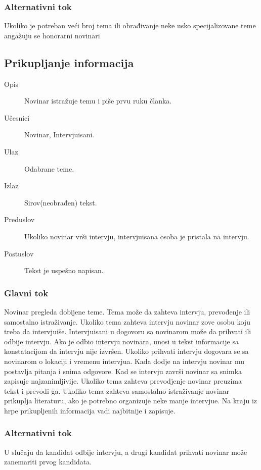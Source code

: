 \subsubsection{Alternativni tok}
Ukoliko je potreban veći broj tema ili obrađivanje neke usko specijalizovane teme angažuju se honorarni novinari

\subsection{Prikupljanje informacija}
\begin{description}
\item [Opis] Novinar istražuje temu i piše prvu ruku članka.
\item [Učesnici] Novinar, Intervjuisani.
\item [Ulaz] Odabrane teme.
\item [Izlaz] Sirov(neobrađen) tekst.
\item [Preduslov] Ukoliko novinar vrši intervju, intervjuisana osoba je pristala na intervju.
\item [Postuslov] Tekst je uspešno napisan.
\end{description}      
\subsubsection{Glavni tok}
Novinar pregleda dobijene teme. Tema može da zahteva intervju, prevođenje ili samostalno istraživanje. Ukoliko tema zahteva intervju novinar zove osobu koju treba da intervjuiše. Intervjuisani u dogovoru sa novinarom može da prihvati ili odbije intervju. Ako je odbio intervju novinara, unosi u tekst informacije sa konstatacijom da intervju nije izvršen. Ukoliko prihvati intervju dogovara se sa novinarom o lokaciji i vremenu intervjua. Kada dodje na intervju novinar mu postavlja pitanja i snima odgovore. Kad se intervju završi novinar sa snimka zapisuje najzanimljivije. Ukoliko tema zahteva prevodjenje novinar preuzima tekst i prevodi ga. Ukoliko tema zahteva samostalno istraživanje novinar prikuplja literaturu, ako je potrebno organizuje neke manje intervjue. Na kraju iz hrpe prikupljenih informacija vadi najbitnije i zapisuje. 
\subsubsection{Alternativni tok}
U slučaju da kandidat odbije intervju, a drugi kandidat prihvati novinar može zanemariti prvog kandidata. 


